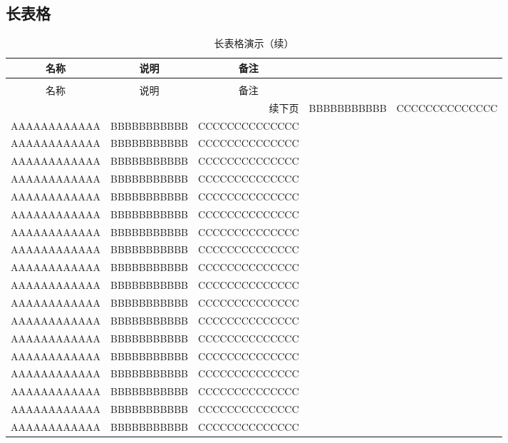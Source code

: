 \subsection{长表格}
\begin{longtable}{ccc}
\caption[长表格演示]{长表格演示} \label{tab:longtable} \\
\toprule[1.5pt]
名称  & 说明 & 备注\\
\midrule[1pt]
\endfirsthead
\caption[]{长表格演示（续）} \\
\toprule[1.5pt]
名称  & 说明 & 备注 \\
\midrule[1pt]
\endhead
\hline
\multicolumn{3}{r}{\small 续下页}
\endfoot
\bottomrule[1.5pt]
\endlastfoot

AAAAAAAAAAAA   &   BBBBBBBBBBB   &   CCCCCCCCCCCCCC   \\
AAAAAAAAAAAA   &   BBBBBBBBBBB   &   CCCCCCCCCCCCCC   \\
AAAAAAAAAAAA   &   BBBBBBBBBBB   &   CCCCCCCCCCCCCC   \\
AAAAAAAAAAAA   &   BBBBBBBBBBB   &   CCCCCCCCCCCCCC   \\
AAAAAAAAAAAA   &   BBBBBBBBBBB   &   CCCCCCCCCCCCCC   \\
AAAAAAAAAAAA   &   BBBBBBBBBBB   &   CCCCCCCCCCCCCC   \\
AAAAAAAAAAAA   &   BBBBBBBBBBB   &   CCCCCCCCCCCCCC   \\
AAAAAAAAAAAA   &   BBBBBBBBBBB   &   CCCCCCCCCCCCCC   \\
AAAAAAAAAAAA   &   BBBBBBBBBBB   &   CCCCCCCCCCCCCC   \\
AAAAAAAAAAAA   &   BBBBBBBBBBB   &   CCCCCCCCCCCCCC   \\
AAAAAAAAAAAA   &   BBBBBBBBBBB   &   CCCCCCCCCCCCCC   \\
AAAAAAAAAAAA   &   BBBBBBBBBBB   &   CCCCCCCCCCCCCC   \\
AAAAAAAAAAAA   &   BBBBBBBBBBB   &   CCCCCCCCCCCCCC   \\
AAAAAAAAAAAA   &   BBBBBBBBBBB   &   CCCCCCCCCCCCCC   \\
AAAAAAAAAAAA   &   BBBBBBBBBBB   &   CCCCCCCCCCCCCC   \\
AAAAAAAAAAAA   &   BBBBBBBBBBB   &   CCCCCCCCCCCCCC   \\
AAAAAAAAAAAA   &   BBBBBBBBBBB   &   CCCCCCCCCCCCCC   \\
AAAAAAAAAAAA   &   BBBBBBBBBBB   &   CCCCCCCCCCCCCC   \\
AAAAAAAAAAAA   &   BBBBBBBBBBB   &   CCCCCCCCCCCCCC   \\

\end{longtable}
